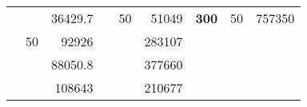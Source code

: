 \begin{table}[H]
\begin{tabular}{|ccrccrccc}
\rowcolor[HTML]{DDFDFF} 
\multicolumn{1}{|c|}{\cellcolor[HTML]{FFFFC7}}                                & \multicolumn{1}{c|}{\cellcolor[HTML]{DDFDFF}}                      & \multicolumn{1}{r|}{\cellcolor[HTML]{DAE8FC}36429.7}   & \multicolumn{1}{c|}{\cellcolor[HTML]{FFFFC7}}                                & \multicolumn{1}{c|}{\multirow{-10}{*}{\cellcolor[HTML]{DDFDFF}50}}  & \multicolumn{1}{r|}{\cellcolor[HTML]{DDFDFF}51049}     & \multicolumn{1}{c|}{\multirow{-19}{*}{\cellcolor[HTML]{FFFFC7}\textbf{300}}} & \multicolumn{1}{c|}{\multirow{-10}{*}{\cellcolor[HTML]{DDFDFF}50}} & \multicolumn{1}{r|}{\cellcolor[HTML]{DDFDFF}757350}    \\ \cline{3-3} \cline{5-9} 
\multicolumn{1}{|c|}{\cellcolor[HTML]{FFFFC7}}                                & \multicolumn{1}{c|}{\multirow{-10}{*}{\cellcolor[HTML]{DDFDFF}50}} & \multicolumn{1}{r|}{\cellcolor[HTML]{DDFDFF}92926}     & \multicolumn{1}{c|}{\cellcolor[HTML]{FFFFC7}}                                & \multicolumn{1}{c|}{\cellcolor[HTML]{DAE8FC}}                       & \multicolumn{1}{r|}{\cellcolor[HTML]{DAE8FC}283107}    &                                                                              &                                                                    &                                                        \\ \cline{2-3} \cline{6-6}
\multicolumn{1}{|c|}{\cellcolor[HTML]{FFFFC7}}                                & \multicolumn{1}{c|}{\cellcolor[HTML]{DAE8FC}}                      & \multicolumn{1}{r|}{\cellcolor[HTML]{DAE8FC}88050.8}   & \multicolumn{1}{c|}{\cellcolor[HTML]{FFFFC7}}                                & \multicolumn{1}{c|}{\cellcolor[HTML]{DAE8FC}}                       & \multicolumn{1}{r|}{\cellcolor[HTML]{DDFDFF}377660}    &                                                                              &                                                                    &                                                        \\ \cline{3-3} \cline{6-6}
\multicolumn{1}{|c|}{\cellcolor[HTML]{FFFFC7}}                                & \multicolumn{1}{c|}{\cellcolor[HTML]{DAE8FC}}                      & \multicolumn{1}{r|}{\cellcolor[HTML]{DDFDFF}108643}    & \multicolumn{1}{c|}{\cellcolor[HTML]{FFFFC7}}                                & \multicolumn{1}{c|}{\cellcolor[HTML]{DAE8FC}}                       & \multicolumn{1}{r|}{\cellcolor[HTML]{DAE8FC}210677}    &                                                                              &                                                                    &                                                        \\ \cline{3-3} \cline{6-6}

\end{tabular}
\end{table}

